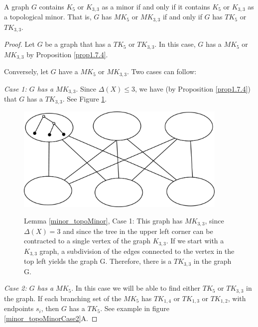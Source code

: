\begin{lemma}\label{minor_topoMinor}
A graph $G$ contains $K_5$ or $K_{3,3}$ as a minor if and only if it contains $K_5$ or $K_{3,3}$ as a topological minor. That is, $G$ has $MK_5$ or $MK_{3,3}$ if and only if $G$ has $TK_5$ or $TK_{3,3}$. 
\end{lemma}
\begin{proof}
Let $G$ be a graph that has a $TK_5$ or $TK_{3,3}$. In this case, $G$ has a $MK_5$ or $MK_{3,3}$ by Proposition \ref{prop1.7.4}. 

Conversely, let $G$ have a $MK_5$ or $MK_{3,3}$. Two cases can follow:

\emph{Case 1: $G$ has a $MK_{3,3}$}. Since $\Delta(X) \leq 3$, we have (by Proposition \ref{prop1.7.4}) that $G$ has a $TK_{3,3}$. See Figure \ref{minor_topoMinorCase1}.

\begin{figure}[htbp]
	\centering
	\includegraphics[height=2in]{minor_topoMinorCase1.eps} \\ 
	\caption{Lemma \ref{minor_topoMinor}, Case 1: This graph has $MK_{3,3}$, since  $\Delta(X) = 3$ and since the tree in the upper left corner can be contracted to a single vertex of the graph $K_{3,3}$. If we start with a $K_{3,3}$ graph, a subdivision of the edges connected to the vertex in the top left yields the graph G. Therefore, there is a $TK_{3,3}$ in the graph G.}
\label{minor_topoMinorCase1}
\end{figure}

\emph{Case 2: $G$ has a $MK_5$}. In this case we will be able to find either $TK_5$ or $TK_{3,3}$ in the graph. If each branching set of the $MK_5$ has $TK_{1,4}$ or $TK_{1,3}$ or $TK_{1,2}$, with endpoints $s_i$, then $G$ has a $TK_5$. See example in figure \ref{minor_topoMinorCase2}A.


\end{proof}
